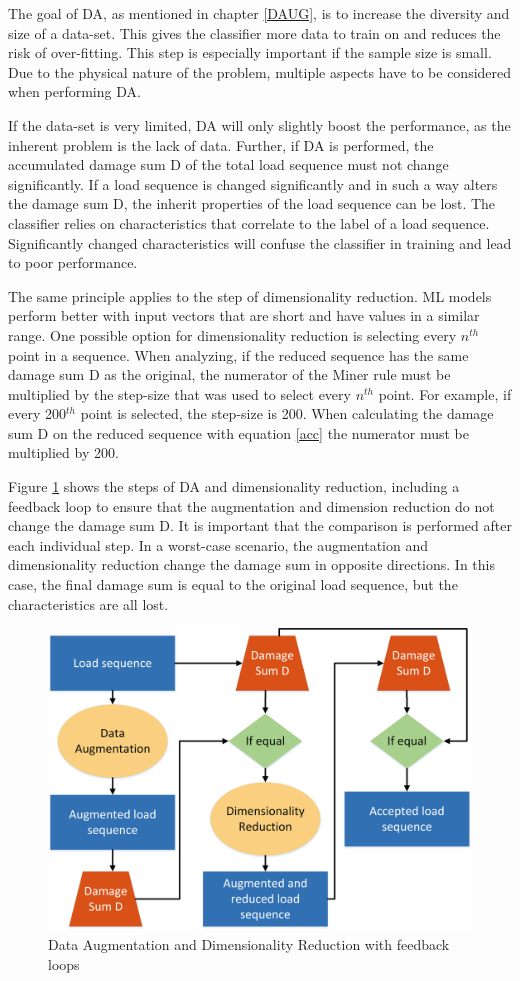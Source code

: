 The goal of DA, as mentioned in chapter \ref{DAUG}, is to increase the diversity and size of a data-set. This gives the classifier more data to train on and reduces the risk of over-fitting.
This step is especially important if the sample size is small. Due to the physical nature of the problem, multiple aspects have to be considered when performing DA.

If the data-set is very limited, DA will only slightly boost the performance, as the inherent problem is the lack of data. Further, if DA is performed, the accumulated damage sum D of the total load sequence must not change significantly. If a load sequence is changed significantly and in such a way alters the damage sum D, the inherit properties of the load sequence can be lost. The classifier relies on characteristics that correlate to the label of a load sequence. Significantly changed characteristics will confuse the classifier in training and lead to poor performance.


The same principle applies to the step of dimensionality reduction. ML models perform better with input vectors that are short and have values in a similar range. One possible option for dimensionality reduction is selecting every \(n^{th}\) point in a sequence.
When analyzing, if the reduced sequence has the same damage sum D as the original, the numerator of the Miner rule must be multiplied by the step-size that was used to select every \(n^{th}\) point. For example, if every 200\(^{th}\) point is selected, the step-size is 200. When calculating the damage sum D on the reduced sequence with equation \ref{acc} the numerator must be multiplied by 200.


Figure \ref{fig:DAUG} shows the steps of DA and dimensionality reduction, including a feedback loop to ensure that the augmentation and dimension reduction do not change the damage sum D.
It is important that the comparison is performed after each individual step. In a worst-case scenario, the augmentation and dimensionality reduction change the damage sum in opposite directions. In this case, the final damage sum is equal to the original load sequence, but the characteristics are all lost.

 
\begin{figure}[H]
	\centering
	\includegraphics[width=0.8\linewidth]{IMGs/DAUG.png}
	\caption{Data Augmentation and Dimensionality Reduction with feedback loops}
	\label{fig:DAUG}
\end{figure}


